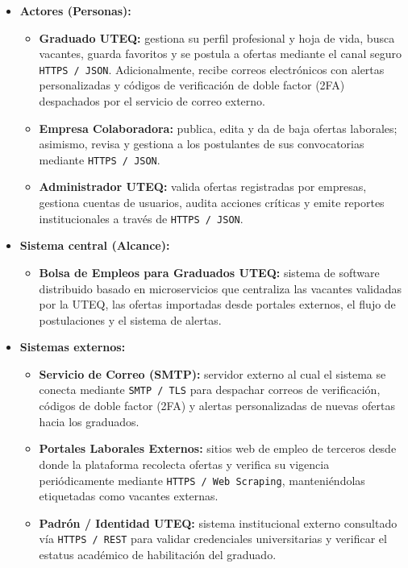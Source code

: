 \documentclass[11pt,a4paper]{article}
\begin{document}
\begin{itemize}
    \item \textbf{Actores (Personas):}
    \begin{itemize}
        \item \textbf{Graduado UTEQ:} gestiona su perfil profesional y hoja de vida, busca vacantes, guarda favoritos y se postula a ofertas mediante el canal seguro \texttt{HTTPS / JSON}. Adicionalmente, recibe correos electrónicos con alertas personalizadas y códigos de verificación de doble factor (2FA) despachados por el servicio de correo externo.
        \item \textbf{Empresa Colaboradora:} publica, edita y da de baja ofertas laborales; asimismo, revisa y gestiona a los postulantes de sus convocatorias mediante \texttt{HTTPS / JSON}.
        \item \textbf{Administrador UTEQ:} valida ofertas registradas por empresas, gestiona cuentas de usuarios, audita acciones críticas y emite reportes institucionales a través de \texttt{HTTPS / JSON}.
    \end{itemize}
    \item \textbf{Sistema central (Alcance):}
    \begin{itemize}
        \item \textbf{Bolsa de Empleos para Graduados UTEQ:} sistema de software distribuido basado en microservicios que centraliza las vacantes validadas por la UTEQ, las ofertas importadas desde portales externos, el flujo de postulaciones y el sistema de alertas.
    \end{itemize}
    \item \textbf{Sistemas externos:}
    \begin{itemize}
        \item \textbf{Servicio de Correo (SMTP):} servidor externo al cual el sistema se conecta mediante \texttt{SMTP / TLS} para despachar correos de verificación, códigos de doble factor (2FA) y alertas personalizadas de nuevas ofertas hacia los graduados.
        \item \textbf{Portales Laborales Externos:} sitios web de empleo de terceros desde donde la plataforma recolecta ofertas y verifica su vigencia periódicamente mediante \texttt{HTTPS / Web Scraping}, manteniéndolas etiquetadas como vacantes externas.
        \item \textbf{Padrón / Identidad UTEQ:} sistema institucional externo consultado vía \texttt{HTTPS / REST} para validar credenciales universitarias y verificar el estatus académico de habilitación del graduado.
    \end{itemize}
\end{itemize}
\end{document}
